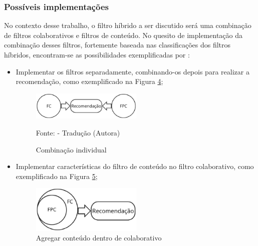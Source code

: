 \subsubsection{Possíveis implementações}\label{subsubsec:implemfh}
No contexto desse trabalho, o filtro híbrido a ser discutido será uma combinação de filtros colaborativos e filtros de 
conteúdo. No quesito de implementação da combinação desses filtros, fortemente baseada nas classificações dos filtros 
híbridos, encontram-se as possibilidades exemplificadas por 
:

\begin{itemize}
    \item Implementar os filtros separadamente, combinando-os depois para realizar a recomendação, como exemplificado na Figura
    \hyperref[fig:combind]{4};

    \begin{figure}[H]
        \centering
        \caption{Combinação individual}
        \label{fig:combind}
        
        \vspace{2pt} %
        
        \includegraphics[width=0.5\textwidth]{figuras/combin2.eps}
        
        \vspace{2pt} %
        
        \small Fonte: \cite{thorat2015survey} - Tradução (Autora)
    \end{figure}

    \item Implementar características do filtro de conteúdo no filtro colaborativo, como exemplificado na Figura
    \hyperref[fig:cfcbf]{5};

    \begin{figure}[H]
        \centering
        \caption{Agregar conteúdo dentro de colaborativo}
        \label{fig:cfcbf}
        
        \vspace{2pt} %
        
        \includegraphics[width=0.5\textwidth]{figuras/cfcbf2.eps}
        

\end{figure}
\end{itemize}
